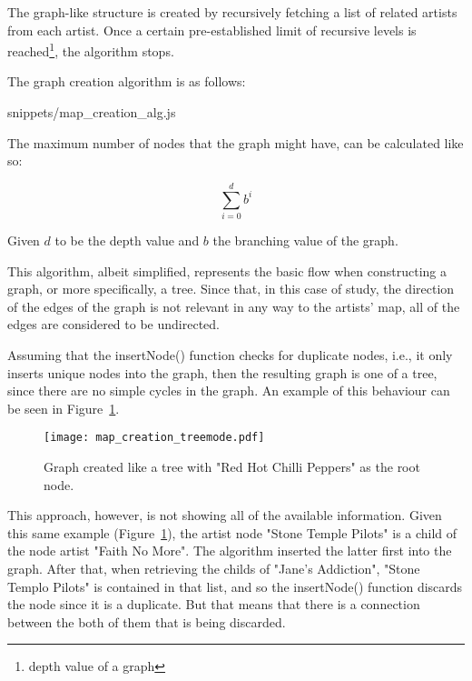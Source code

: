       The graph-like structure is created by recursively fetching a list of related artists from each artist. Once a certain pre-established limit of recursive levels is reached\footnote{depth value of a graph}, the algorithm stops.

      The graph creation algorithm is as follows:

      
      {snippets/map_creation_alg.js}

      The maximum number of nodes that the graph might have, can be calculated like so:

      \begin{equation}
          \sum_{i=0}^{d} b ^ i
      \end{equation}

      Given $d$ to be the depth value and $b$ the branching value of the graph.

      This algorithm, albeit simplified, represents the basic flow when constructing a graph, or more specifically, a tree.
      Since that, in this case of study, the direction of the edges of the graph is not relevant in any way to the artists' map, all of the edges are considered to be undirected.

      Assuming that the insertNode() function checks for duplicate nodes, i.e., it only inserts unique nodes into the graph, then the resulting graph is one of a tree, since there are no simple cycles in the graph.
      An example of this behaviour can be seen in Figure~\ref{fig:graph_treemode}.

      \begin{figure}[ht]
        \begin{center}
          \texttt{[image: map\_creation\_treemode.pdf]}
        \end{center}
        \caption{Graph created like a tree with "Red Hot Chilli Peppers" as the root node.}
        \label{fig:graph_treemode}
      \end{figure}

      This approach, however, is not showing all of the available information.
      Given this same example (Figure~\ref{fig:graph_treemode}), the artist node "Stone Temple Pilots" is a child of the node artist "Faith No More".
      The algorithm inserted the latter first into the graph.
      After that, when retrieving the childs of "Jane's Addiction", "Stone Templo Pilots" is contained in that list, and so the insertNode() function discards the node since it is a duplicate.
      But that means that there is a connection between the both of them that is being discarded.

